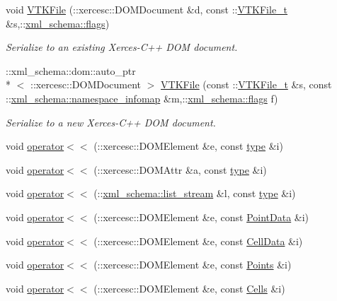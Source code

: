 \begin{DoxyCompactItemize}
void \hyperlink{vtk-unstructured_8cpp_a5303826a26dc8b0981ea314365205514}{V\+T\+K\+File} (\+::xercesc\+::\+D\+O\+M\+Document \&d, const \+::\hyperlink{classVTKFile__t}{V\+T\+K\+File\+\_\+t} \&s,\+::\hyperlink{namespacexml__schema_a8d981c127a1f5106d04ad5853e707361}{xml\+\_\+schema\+::flags})
\begin{DoxyCompactList}\small\item\em Serialize to an existing Xerces-\/\+C++ D\+O\+M document. \end{DoxyCompactList}\item 
\+::xml\+\_\+schema\+::dom\+::auto\+\_\+ptr\\*
$<$ \+::xercesc\+::\+D\+O\+M\+Document $>$ \hyperlink{vtk-unstructured_8cpp_a6e2336ff7eefc4b5fd245cc8c12815c6}{V\+T\+K\+File} (const \+::\hyperlink{classVTKFile__t}{V\+T\+K\+File\+\_\+t} \&s, const \+::\hyperlink{namespacexml__schema_ad52b6e3505153cb30ba3452f7868450e}{xml\+\_\+schema\+::namespace\+\_\+infomap} \&m,\+::\hyperlink{namespacexml__schema_a8d981c127a1f5106d04ad5853e707361}{xml\+\_\+schema\+::flags} f)
\begin{DoxyCompactList}\small\item\em Serialize to a new Xerces-\/\+C++ D\+O\+M document. \end{DoxyCompactList}\item 
void \hyperlink{vtk-unstructured_8cpp_a39982a892c5c712b9ceaf5451fc6f4ad}{operator$<$$<$} (\+::xercesc\+::\+D\+O\+M\+Element \&e, const \hyperlink{classtype}{type} \&i)
\item 
void \hyperlink{vtk-unstructured_8cpp_a4fb8d54838ba8178be88528f342c8b27}{operator$<$$<$} (\+::xercesc\+::\+D\+O\+M\+Attr \&a, const \hyperlink{classtype}{type} \&i)
\item 
void \hyperlink{vtk-unstructured_8cpp_abc84c964f7011b68cb249e0dd527a052}{operator$<$$<$} (\+::\hyperlink{namespacexml__schema_ab6c818ac91e70a25620375e0d000be83}{xml\+\_\+schema\+::list\+\_\+stream} \&l, const \hyperlink{classtype}{type} \&i)
\item 
void \hyperlink{vtk-unstructured_8cpp_a03c700ca3f77780311236cfbb43b28a6}{operator$<$$<$} (\+::xercesc\+::\+D\+O\+M\+Element \&e, const \hyperlink{classPointData}{Point\+Data} \&i)
\item 
void \hyperlink{vtk-unstructured_8cpp_a9000f9f93a0e3f8c8a2d0de1ddae77c8}{operator$<$$<$} (\+::xercesc\+::\+D\+O\+M\+Element \&e, const \hyperlink{classCellData}{Cell\+Data} \&i)
\item 
void \hyperlink{vtk-unstructured_8cpp_a155fa88f0f3a3fb5f55f06539205ef01}{operator$<$$<$} (\+::xercesc\+::\+D\+O\+M\+Element \&e, const \hyperlink{classPoints}{Points} \&i)
\item 
void \hyperlink{vtk-unstructured_8cpp_a043b0bbda942e0878ce7a8f63ddefe79}{operator$<$$<$} (\+::xercesc\+::\+D\+O\+M\+Element \&e, const \hyperlink{classCells}{Cells} \&i)
\end{DoxyCompactItemize}


